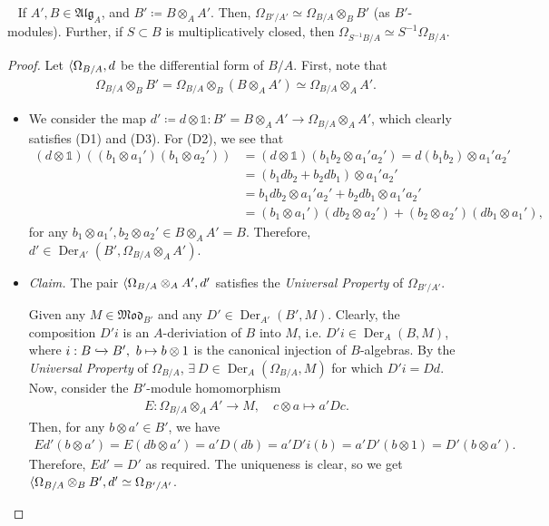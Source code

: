 \documentclass[11pt,a4paper,footinclude=true,headinclude=true]{scrbook} %
\DeclareMathOperator{\Der}{Der}
\newcommand{\<}{\langle}
\let\>\relax
\newcommand{\>}{\rangle}
\newcommand{\MOD}{\mathfrak{Mod}}
\newcommand{\ALG}{\mathfrak{Alg}}
\newenvironment{proposition}[2][]
{\renewcommand\theinnercustomprop{#2}\innercustomprop[#1] 
\begin{mdframed}[backgroundcolor=gray!20]\ }
{\end{mdframed}\endinnercustomprop}
\begin{document}
\begin{proposition}{8.2}
    If $A',B\in\ALG_A$, and $B'\coloneqq B\otimes_AA'$. Then, $\Omega_{B'/A'}\simeq\Omega_{B/A}\otimes_BB'$ (as $B'$-modules). Further, if $S\subset B$ is multiplicatively closed, then $\Omega_{S^{-1}B/A}\simeq S^{-1}\Omega_{B/A}$.
\end{proposition}
\begin{proof}
    Let $\<\Omega_{B/A},d\>$ be the differential form of $B/A$. First, note that
    \begin{align*}
        \Omega_{B/A}\otimes_BB'=\Omega_{B/A}\otimes_B(B\otimes_AA')\simeq\Omega_{B/A}\otimes_AA'.
    \end{align*}
    \begin{itemize}
        \item We consider the map $d'\coloneqq d\otimes\mathds{1}:B'=B\otimes_AA'\to\Omega_{B/A}\otimes_AA'$, which clearly satisfies (D1) and (D3). For (D2), we see that
        \begin{align*}
            (d\otimes\mathds{1})((b_1\otimes a_1')(b_1\otimes a_2')) &=(d\otimes\mathds{1})(b_1b_2\otimes a_1'a_2')=d(b_1b_2)\otimes a_1'a_2'\\ &=(b_1db_2+b_2db_1)\otimes a_1'a_2'\\ &=b_1db_2\otimes a_1'a_2'+b_2db_1\otimes a_1'a_2'\\ &=(b_1\otimes a_1')(db_2\otimes a_2')+(b_2\otimes a_2')(db_1\otimes a_1'),
        \end{align*}
        for any $b_1\otimes a_1',b_2\otimes a_2'\in B\otimes_AA'=B$. Therefore, $d'\in\Der_{A'}(B',\Omega_{B/A}\otimes_AA')$.
        \item \textit{Claim.} The pair $\<\Omega_{B/A}\otimes_AA',d'\>$ satisfies the \textit{Universal Property} of $\Omega_{B'/A'}$.
        
        Given any $M\in\MOD_{B'}$ and any $D'\in\Der_{A'}(B',M)$. Clearly, the composition $D'i$ is an $A$-deriviation of $B$ into $M$, i.e. $D'i\in\Der_A(B,M)$, where $i:B\xhookrightarrow{}B',\ b\mapsto b\otimes1$ is the canonical injection of $B$-algebras. By the \textit{Universal Property} of $\Omega_{B/A}$, $\exists\ D\in\Der_A(\Omega_{B/A},M)$ for which $D'i=Dd$. Now, consider the $B'$-module homomorphism
        \begin{align*}
            E:\Omega_{B/A}\otimes_AA'\longrightarrow M,\quad c\otimes a\longmapsto a'Dc.
        \end{align*}
        Then, for any $b\otimes a'\in B'$, we have
        \begin{align*}
            Ed'(b\otimes a')=E(db\otimes a')=a'D(db)=a'D'i(b)=a'D'(b\otimes1)=D'(b\otimes a').
        \end{align*}
        Therefore, $Ed'=D'$ as required. The uniqueness is clear, so we get $\<\Omega_{B/A}\otimes_BB',d'\>\simeq\Omega_{B'/A'}$.
    \end{itemize}
\end{proof}
\end{document}
